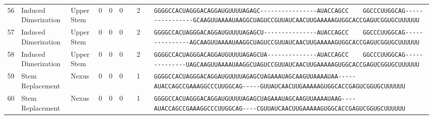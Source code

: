 \begin{tabular}{rllrrrrrcl}
 56 & Induced Dimerization & Upper Stem & 0 & 0 & 0 &  & 2 &  &
 \color{ucsfdarkgrey}\verb|GGGGCCACUAGGGACAGGAU|\color{ucsforange}\verb|GUUUUA|\color{ucsfblue}\verb|GAGC----------------|\color{ucsfpurple}\verb|AUACCAGCC    GGCCCUUGGCAG|\color{ucsfblue}\verb|----------------GCAAGU|\color{ucsforange}\verb|UAAAAUAA|\color{ucsfnavy}\verb|GGCUAGUCC|\color{ucsforange}\verb|GUUAUCA|\color{ucsfteal}\verb|ACUUGAAAAAGU|\color{ucsforange}\verb|GGCACCGAGUCGGUGCUUUUUU| \\

 57 & Induced Dimerization & Upper Stem & 0 & 0 & 0 &  & 2 &  &
 \color{ucsfdarkgrey}\verb|GGGGCCACUAGGGACAGGAU|\color{ucsforange}\verb|GUUUUA|\color{ucsfblue}\verb|GAGCU---------------|\color{ucsfpurple}\verb|AUACCAGCC    GGCCCUUGGCAG|\color{ucsfblue}\verb|---------------AGCAAGU|\color{ucsforange}\verb|UAAAAUAA|\color{ucsfnavy}\verb|GGCUAGUCC|\color{ucsforange}\verb|GUUAUCA|\color{ucsfteal}\verb|ACUUGAAAAAGU|\color{ucsforange}\verb|GGCACCGAGUCGGUGCUUUUUU| \\

 58 & Induced Dimerization & Upper Stem & 0 & 0 & 0 &  & 2 &  &
 \color{ucsfdarkgrey}\verb|GGGGCCACUAGGGACAGGAU|\color{ucsforange}\verb|GUUUUA|\color{ucsfblue}\verb|GAGCUA--------------|\color{ucsfpurple}\verb|AUACCAGCC    GGCCCUUGGCAG|\color{ucsfblue}\verb|--------------UAGCAAGU|\color{ucsforange}\verb|UAAAAUAA|\color{ucsfnavy}\verb|GGCUAGUCC|\color{ucsforange}\verb|GUUAUCA|\color{ucsfteal}\verb|ACUUGAAAAAGU|\color{ucsforange}\verb|GGCACCGAGUCGGUGCUUUUUU| \\

\midrule

 59 & Stem Replacement & Nexus & 0 & 0 & 0 &  & 1 &  &
 \color{ucsfdarkgrey}\verb|GGGGCCACUAGGGACAGGAU|\color{ucsforange}\verb|GUUUUA|\color{ucsfblue}\verb|GAGCUAGAAAUAGCAAGU|\color{ucsforange}\verb|UAAAAUAA|\color{ucsfnavy}\verb|-----|\color{ucsfpurple}\verb|AUACCAGCCGAAAGGCCCUUGGCAG|\color{ucsfnavy}\verb|-----|\color{ucsforange}\verb|GUUAUCA|\color{ucsfteal}\verb|ACUUGAAAAAGU|\color{ucsforange}\verb|GGCACCGAGUCGGUGCUUUUUU| \\

 60 & Stem Replacement & Nexus & 0 & 0 & 0 &  & 1 &  &
 \color{ucsfdarkgrey}\verb|GGGGCCACUAGGGACAGGAU|\color{ucsforange}\verb|GUUUUA|\color{ucsfblue}\verb|GAGCUAGAAAUAGCAAGU|\color{ucsforange}\verb|UAAAAUAA|\color{ucsfnavy}\verb|G----|\color{ucsfpurple}\verb|AUACCAGCCGAAAGGCCCUUGGCAG|\color{ucsfnavy}\verb|----C|\color{ucsforange}\verb|GUUAUCA|\color{ucsfteal}\verb|ACUUGAAAAAGU|\color{ucsforange}\verb|GGCACCGAGUCGGUGCUUUUUU| \\


\end{tabular}
